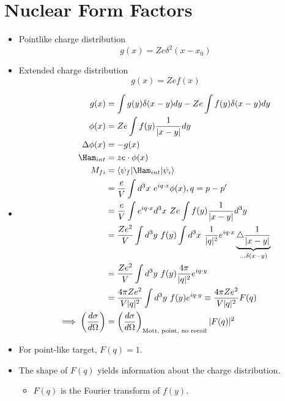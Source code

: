 \documentclass[a4paper, 11pt, normalem]{report}
\begin{document}
\section{Nuclear Form Factors}
\begin{itemize}
    \item Pointlike charge distribution
        \begin{equation}
            g(x) = Ze\delta^2(x-x_0)
        \end{equation}
    \item Extended charge distribution
        \begin{equation}
            g(x) = Zef(x)
        \end{equation}
    \item
        \begin{align}
            g(x) &= \int g(y) \delta(x-y) dy - Ze \int f(y) \delta(x-y) dy \\
            \phi(x) &= Ze \int f(y) \frac{1}{|x-y|}dy \\
            \Delta\phi(x) &= -g(x) \\
            \Ham_{int} &= ze\cdot\phi(x) \\
            M_{fi} &= \langle \psi_f | \Ham_{int} | \psi_i \rangle \\
                   &= \frac{e}{V} \int d^3x ~ e^{iq\cdot x} \phi(x), q = p-p' \\
                   &= \frac{e}{V} \int e^{iq\cdot x} d^3x ~ Ze\int f(y) \frac{1}{|x-y|} d^3 y \\
                   &= \frac{Ze^2}{V} \int d^3y ~ f(y) \int d^3x ~ \frac{1}{|q|^2} e^{iq\cdot x} \underbrace{\bigtriangleup \frac{1}{|x-y|}}_{...\delta(x-y)} \\
                   &= \frac{Ze^2}{V} \int d^3y~ f(y) \frac{4\pi}{|q|^2} e^{iq\cdot y} \\
                   &= \frac{4\pi Ze^2}{V|q|^2}  \int d^3y ~ f(y)e^{iq\cdot y} \equiv \frac{4\pi Ze^2}{V|q|^2} F(q) \\
            \implies \left(\frac{d\sigma}{d\Omega}\right) &= \left(\frac{d\sigma}{d\Omega}\right)_{\text{Mott, point, no recoil}} |F(q)|^2
        \end{align}
    \item For point-like target, $F(q) = 1$.
    \item The shape of $F(q)$ yields information about the charge distribution. 
        \begin{itemize}
            \item $F(q)$ is the Fourier transform of $f(y)$.

\end{itemize}
\end{itemize}
\end{document}
